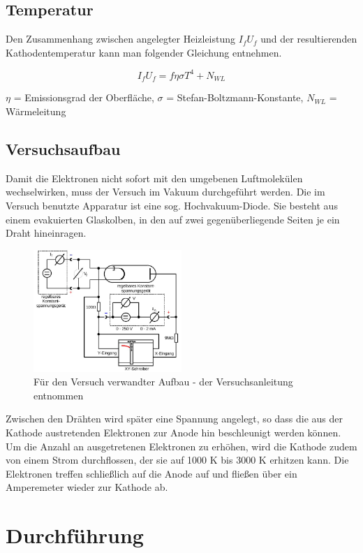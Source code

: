 \subsection{Temperatur}
Den Zusammenhang zwischen angelegter Heizleistung $I_f U_f$ und der resultierenden Kathodentemperatur kann man folgender Gleichung entnehmen.

\begin{formel}
\begin{equation}
I_f U_f = f \eta \sigma T^4 + N_{WL}
\label{eq_temperatur}
\end{equation}
\caption*{\small{$\eta$ = Emissionsgrad der Oberfläche, $\sigma$ =  Stefan-Boltzmann-Konstante, $N_{WL}$ = Wärmeleitung}}
\end{formel}

\subsection{Versuchsaufbau}
Damit die Elektronen nicht sofort mit den umgebenen Luftmolekülen wechselwirken, muss der Versuch im Vakuum durchgeführt werden. Die im Versuch benutzte Apparatur ist eine sog. Hochvakuum-Diode. Sie besteht aus einem evakuierten Glaskolben, in den auf zwei gegenüberliegende Seiten je ein Draht hineinragen.
\begin{figure}[H]
\includegraphics[width=0.5\textwidth]{pics/aufbau1.jpg}
\caption{Für den Versuch verwandter Aufbau - der Versuchsanleitung entnommen}
\end{figure}
Zwischen den Drähten wird später eine Spannung angelegt, so dass die aus der Kathode austretenden Elektronen zur Anode hin beschleunigt werden können. Um die Anzahl an ausgetretenen Elektronen zu erhöhen, wird die Kathode zudem von einem Strom durchflossen, der sie auf 1000 K bis 3000 K erhitzen kann. Die Elektronen treffen schließlich auf die Anode auf und fließen über ein Amperemeter wieder zur Kathode ab.

\section{Durchführung}
